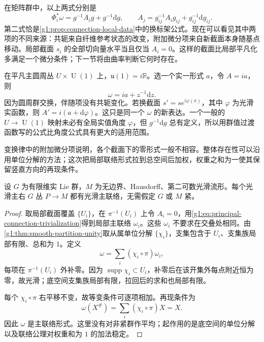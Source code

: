 在矩阵群中，以上两式分别是
\[
	\Phi_i^*\omega=g^{-1}A_i g+g^{-1}\mathrm{d}g,
	\qquad A_j=g_{ij}^{-1}A_i g_{ij}+g_{ij}^{-1}\mathrm{d}g_{ij}.
\]
第二式恰是\cref{g1:prop:connection-local-data}中的换标架公式。现在可以看见其中两项的不同来源：共轭来自纤维参考状态的改变，附加微分项来自新截面本身随基点移动。局部截面 \(s_i\) 的全部切向量水平当且仅当 \(A_i=0\)。这样的截面比局部平凡化多满足一个微分条件；下一节将由曲率判断它何时存在。

\begin{example}\label{g1:exm:principal-circle-local-change}
	在平凡主圆周丛 \(U\times\operatorname{U}(1)\) 上，\(\mathfrak u(1)=i\mathbb R\)。选一个实一形式 \(a\)，令 \(A=i a\)，则
	\[
		\omega=i a+z^{-1}\mathrm{d}z.
	\]
	因为圆周群交换，伴随项没有共轭变化。若换截面 \(s'=s e^{i\varphi(x)}\)，其中 \(\varphi\) 为光滑实函数，则 \(A'=i(a+\mathrm{d}\varphi)\)。这只是同一个 \(\omega\) 的新表达。一个一般的 \(U\to\operatorname{U}(1)\) 映射未必有全局实值角度 \(\varphi\)，但 \(g^{-1}\mathrm{d}g\) 总有定义，所以用群值过渡函数写的公式比角度公式具有更大的适用范围。
\end{example}

变换律中的附加微分项说明，各个截面下的零形式一般不相容。整体存在性可以沿用单位分解的方法；这次把局部联络形式拉到总空间后加权，权重之和为一使其保留竖直方向的再现条件。

\begin{theorem}\label{g1:thm:principal-connection-existence}
	设 \(G\) 为有限维实 Lie 群，\(M\) 为无边界、Hausdorff、第二可数光滑流形。每个光滑主右 \(G\) 丛 \(P\to M\) 都有光滑主联络，无需假定 \(G\) 或 \(M\) 紧。
\end{theorem}
\begin{proof}
	取局部截面覆盖 \(\{U_i\}\)，在 \(\pi^{-1}(U_i)\) 上令 \(A_i=0\)，用\eqref{g1:eq:principal-connection-trivialization}得到局部主联络 \(\omega_i\)。这些 \(\omega_i\) 不要求在交叠处相同。由\cref{g1:thm:smooth-partition-unity}取从属单位分解 \(\{\chi_i\}\)，支集包含于 \(U_i\)、支集族局部有限、总和为 \(1\)。定义
	\[
		\omega=\sum_i(\chi_i\circ\pi)\omega_i,
	\]
	每项在 \(\pi^{-1}(U_i)\) 外补零。因为 \(\operatorname{supp}\chi_i\subset U_i\)，补零后在该开集外每点附近恒为零，故光滑；底空间支集族局部有限，拉回后的求和也局部有限。

	每个 \(\chi_i\circ\pi\) 右平移不变，故等变条件可逐项相加。再现条件为
	\[
		\omega(X^\#)=\sum_i(\chi_i\circ\pi)X=X.
	\]
	因此 \(\omega\) 是主联络形式。这里没有对非紧群作平均；起作用的是底空间的单位分解以及联络公理对权重和为 \(1\) 的加法稳定。
\end{proof}

